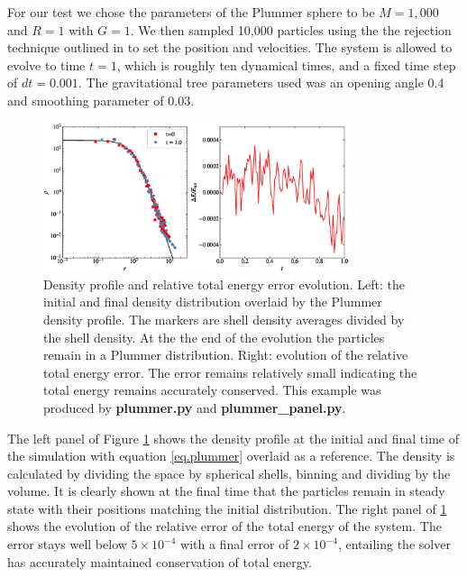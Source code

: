 For our test we chose the parameters of the Plummer sphere to be $M=1,000$ and $R=1$ with
$G=1$. We then sampled 10,000 particles using the the rejection technique outlined in
\cite{Aarseth1974} to set the position and velocities. The system is allowed to evolve to time 
$t=1$, which is roughly ten dynamical times, and a fixed time step of $dt=0.001$. The
gravitational tree parameters used was an opening angle 0.4 and smoothing parameter of 0.03.
\begin{figure}
    \begin{center}
        \includegraphics[width=0.8\textwidth]{figures/plummer.eps}
        \caption{Density profile and relative total energy error evolution. Left: the initial and 
        final density distribution overlaid by the Plummer density profile. The markers are shell
        density averages divided by the shell density. At the the end of the evolution the 
        particles remain in a Plummer distribution. Right: evolution of the  relative total energy 
        error. The error remains relatively small indicating the total energy remains accurately
        conserved. This example was produced by \textbf{plummer.py} and 
        \textbf{plummer\_panel.py}.}
        \label{fig.plummer}
    \end{center}
\end{figure}
The left panel of Figure \ref{fig.plummer} shows the density profile at the initial and final 
time of the simulation with equation \ref{eq.plummer} overlaid as a reference. The density is 
calculated by dividing the space by spherical shells, binning and dividing by the volume. It is 
clearly shown at the final time that the particles remain in steady state with their positions 
matching the initial distribution. The right panel of \ref{fig.plummer} shows the evolution of the 
relative error of the total energy of the system. The error stays well below $5\times 10^{-4}$ with 
a final error of $2\times 10^{-4}$, entailing the solver has accurately maintained conservation
of total energy.

